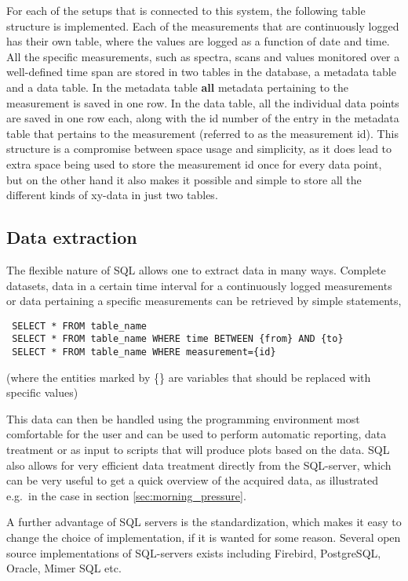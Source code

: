 For each of the setups that is connected to this system, the following
table structure is implemented. Each of the measurements that are
continuously logged has their own table, where the values are logged
as a function of date and time. All the specific measurements, such as
spectra, scans and values monitored over a well-defined time span are
stored in two tables in the database, a metadata table and a data
table. In the metadata table \textbf{all} metadata pertaining to the
measurement is saved in one row. In the data table, all the individual
data points are saved in one row each, along with the id number of the
entry in the metadata table that pertains to the measurement (referred
to as the measurement id). This structure is a compromise between
space usage and simplicity, as it does lead to extra space being used
to store the measurement id once for every data point, but on the
other hand it also makes it possible and simple to store all the
different kinds of xy-data in just two tables.

\subsection{Data extraction} 
The flexible nature of SQL allows one to extract data in many
ways. Complete datasets, data in a certain time interval for a
continuously logged measurements or data pertaining a specific
measurements can be retrieved by simple statements,
\begin{verbatim}
 SELECT * FROM table_name
 SELECT * FROM table_name WHERE time BETWEEN {from} AND {to}
 SELECT * FROM table_name WHERE measurement={id}
\end{verbatim}
(where the entities marked by \{\} are variables that should be
replaced with specific values)

This data can then be handled using the programming environment most
comfortable for the user and can be used to perform automatic
reporting, data treatment or as input to scripts that will produce
plots based on the data. SQL also allows for very efficient data
treatment directly from the SQL-server, which can be very useful to
get a quick overview of the acquired data, as illustrated e.g.\ in the
case in section \ref{sec:morning_pressure}.

A further advantage of SQL servers is the standardization, which makes it easy to
change the choice of implementation, if it is wanted for some reason. Several
open source implementations of SQL-servers exists including Firebird,
PostgreSQL, Oracle, Mimer SQL etc.
